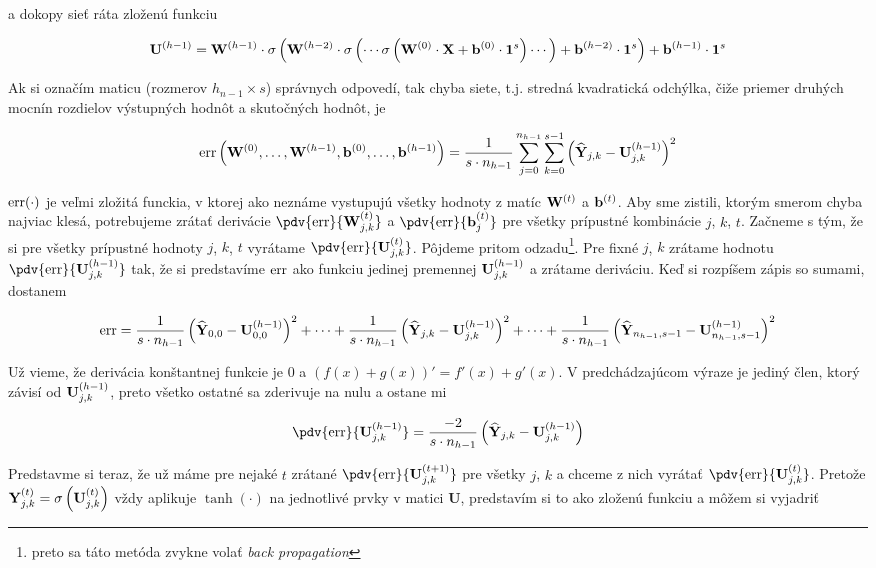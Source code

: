a dokopy sieť ráta zloženú funkciu

$$\mathbf U^{(h-1)}=\mathbf W^{(h-1)}\cdot\sigma\left(\mathbf W^{(h-2)}\cdot\sigma\left(\cdots\sigma\left(\mathbf W^{(0)}\cdot\mathbf X+\mathbf b^{(0)}\cdot\mathbf 1^s\right)\cdots\right)
+\mathbf b^{(h-2)}\cdot\mathbf 1^s\right)
+\mathbf b^{(h-1)}\cdot\mathbf 1^s$$


Ak si označím \yh maticu (rozmerov $h_{n-1}\times s$) správnych odpovedí, tak chyba siete, t.j. stredná kvadratická odchýlka, čiže priemer druhých mocnín rozdielov výstupných hodnôt a skutočných hodnôt, je


$$\mathrm{err}\left(\mathbf W^{(0)},\ldots,\mathbf W^{(h-1)},\mathbf b^{(0)},\ldots,\mathbf b^{(h-1)}\right)
=\frac{1}{s\cdot n_{h-1}}
\sum_{j=0}^{n_{h-1}}
\sum_{k=0}^{s-1}
\left(\widehat{\mathbf Y}_{j,k}-\mathbf U^{(h-1)}_{j,k}\right)^2$$


$\mathrm{err}(\cdot)$ je veľmi zložitá funckia, v ktorej ako neznáme vystupujú všetky hodnoty z matíc $\mathbf W^{(t)}$ a $\mathbf b^{(t)}$. Aby sme zistili, ktorým smerom chyba najviac klesá, 
potrebujeme zrátať derivácie $\pdv{\err}{\bm{W}\up{t}_{j,k}}$ a $\pdv{\err}{\bm{b}\up{t}_j}$ pre všetky prípustné kombinácie $j$, $k$, $t$. 
Začneme s tým, že si pre všetky prípustné hodnoty $j$, $k$, $t$ vyrátame $\pdv{\err}{\bm{U}\up{t}_{j,k}}$.
Pôjdeme pritom odzadu\footnote{preto sa táto metóda zvykne volať {\em back propagation}}. Pre fixné $j$, $k$ zrátame hodnotu $\pdv{\err}{\bm{U}\up{h-1}_{j,k}}$ tak,
že si predstavíme $\mathrm{err}$ ako funkciu jedinej premennej $\mathbf U^{(h-1)}_{j,k}$ a zrátame deriváciu. Keď si rozpíšem zápis so sumami, dostanem

$$\mathrm{err} = \frac{1}{s\cdot n_{h-1}}\left(\widehat{\mathbf Y}_{0,0}-\mathbf U^{(h-1)}_{0,0}\right)^2+\cdots+
 \frac{1}{s\cdot n_{h-1}}\left(\widehat{\mathbf Y}_{j,k}-\mathbf U^{(h-1)}_{j,k}\right)^2+\cdots+
 \frac{1}{s\cdot n_{h-1}}\left(\widehat{\mathbf Y}_{n_{h-1},s-1}-\mathbf U^{(h-1)}_{n_{h-1},s-1}\right)^2
$$

Už vieme, že derivácia konštantnej funkcie je $0$ a $\left(f(x)+g(x)\right)'=f'(x)+g'(x)$. V predchádzajúcom výraze je jediný člen, ktorý závisí od $\mathbf U^{(h-1)}_{j,k}$, preto
všetko ostatné sa zderivuje na nulu a ostane mi

$$\pdv{\err}{\bm{U}\up{h-1}_{j,k}}=\frac{-2}{s\cdot n_{h-1}}\left(\yh_{j,k}-\bm{U}\up{h-1}_{j,k}\right)$$

Predstavme si teraz, že už máme pre nejaké $t$ zrátané $\pdv{\err}{\bm{U}\up{t+1}_{j,k}}$ pre všetky 
$j$, $k$ a chceme z nich vyrátať $\pdv{\err}{\bm{U}\up{t}_{j,k}}$.
Pretože $\mathbf Y^{(t)}_{j,k}=\sigma\left(\mathbf U^{(t)}_{j,k}\right)$ vždy aplikuje $\tanh(\cdot)$ na 
jednotlivé prvky v matici $\bm{U}$, predstavím si to ako zloženú funkciu a môžem si vyjadriť

